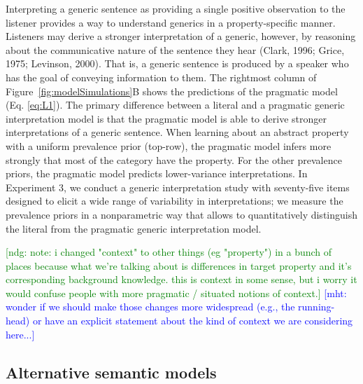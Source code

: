 \documentclass[floatsintext,doc]{apa6}
\begin{document}
Interpreting a generic sentence as providing a single positive observation to the listener provides a way to understand generics in a property-specific manner.
Listeners may derive a stronger interpretation of a generic, however, by reasoning about the communicative nature of the sentence they hear (Clark, 1996; Grice, 1975; Levinson, 2000).
That is, a generic sentence is produced by a speaker who has the goal of conveying information to them.
The rightmost column of Figure~\ref{fig:modelSimulations}B shows the predictions of the pragmatic model (Eq. \ref{eq:L1}).
The primary difference between a literal and a pragmatic generic interpretation model is that the pragmatic model is able to derive stronger interpretations of a generic sentence.
When learning about an abstract property with a uniform prevalence prior (top-row), the pragmatic model infers more strongly that most of the category have the property.
For the other prevalence priors, the pragmatic model predicts lower-variance interpretations.
In Experiment 3, we conduct a generic interpretation study with seventy-five items designed to elicit a wide range of variability in interpretations; we measure the prevalence priors in a nonparametric way that allows to quantitatively distinguish the literal from the pragmatic generic interpretation model.

{\textcolor{Green}{[ndg: note: i changed "context" to other things (eg "property") in a bunch of places because what we're talking about is differences in target property and it's corresponding background knowledge. this is context in some sense, but i worry it would confuse people with more pragmatic / situated notions of context.]}}
{\textcolor{Blue}{[mht: wonder if we should make those changes more widespread (e.g., the running-head) or have an explicit statement about the kind of context we are considering here...]}}

\hypertarget{alternative-semantic-models}{%
\subsection{Alternative semantic models}\label{alternative-semantic-models}}
\end{document}
